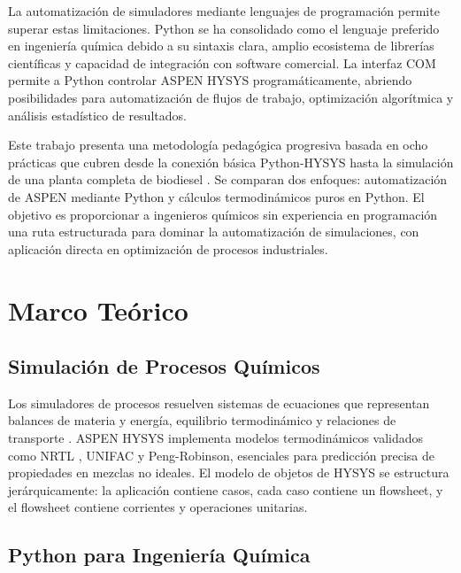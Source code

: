 \documentclass{syx7}
\begin{document}
La automatización de simuladores mediante lenguajes de programación permite superar estas limitaciones. Python se ha consolidado como el lenguaje preferido en ingeniería química \cite{python2023,virtanen2020scipy} debido a su sintaxis clara, amplio ecosistema de librerías científicas y capacidad de integración con software comercial. La interfaz COM permite a Python controlar ASPEN HYSYS programáticamente, abriendo posibilidades para automatización de flujos de trabajo, optimización algorítmica y análisis estadístico de resultados.

Este trabajo presenta una metodología pedagógica progresiva basada en ocho prácticas que cubren desde la conexión básica Python-HYSYS hasta la simulación de una planta completa de biodiesel \cite{demirbas2009biodiesel}. Se comparan dos enfoques: automatización de ASPEN mediante Python y cálculos termodinámicos puros en Python. El objetivo es proporcionar a ingenieros químicos sin experiencia en programación una ruta estructurada para dominar la automatización de simulaciones, con aplicación directa en optimización de procesos industriales.

\section{Marco Teórico}

\subsection{Simulación de Procesos Químicos}

Los simuladores de procesos resuelven sistemas de ecuaciones que representan balances de materia y energía, equilibrio termodinámico y relaciones de transporte \cite{turton2018analysis}. ASPEN HYSYS implementa modelos termodinámicos validados como NRTL \cite{renon1968local}, UNIFAC \cite{fredenslund1975group} y Peng-Robinson, esenciales para predicción precisa de propiedades en mezclas no ideales. El modelo de objetos de HYSYS se estructura jerárquicamente: la aplicación contiene casos, cada caso contiene un flowsheet, y el flowsheet contiene corrientes y operaciones unitarias.

\subsection{Python para Ingeniería Química}
\end{document}
